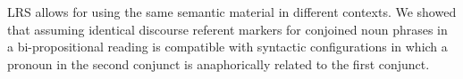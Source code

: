 \documentclass[output=paper]{langsci/langscibook}
\begin{document}
\bigskip%
LRS allows for using the same semantic material in different contexts. 
We showed that assuming identical discourse referent markers for conjoined noun phrases in a bi-propositional reading is compatible with syntactic configurations in which a pronoun in the second conjunct is anaphorically related to the first conjunct. 









\end{document}

